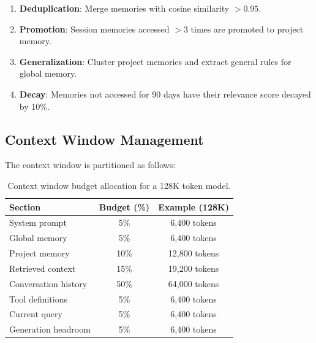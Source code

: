 \begin{enumerate}[leftmargin=1.4em]
    \item \textbf{Deduplication}: Merge memories with cosine similarity $> 0.95$.
    \item \textbf{Promotion}: Session memories accessed $> 3$ times are promoted to project memory.
    \item \textbf{Generalization}: Cluster project memories and extract general rules for global memory.
    \item \textbf{Decay}: Memories not accessed for 90 days have their relevance score decayed by 10\%.
\end{enumerate}

\subsection{Context Window Management}

The context window is partitioned as follows:

\begin{table}[H]
\centering
\begin{tabular}{lcc}
\toprule
\textbf{Section} & \textbf{Budget (\%)} & \textbf{Example (128K)} \\
\midrule
System prompt & 5\% & 6,400 tokens \\
Global memory & 5\% & 6,400 tokens \\
Project memory & 10\% & 12,800 tokens \\
Retrieved context & 15\% & 19,200 tokens \\
Conversation history & 50\% & 64,000 tokens \\
Tool definitions & 5\% & 6,400 tokens \\
Current query & 5\% & 6,400 tokens \\
Generation headroom & 5\% & 6,400 tokens \\
\bottomrule
\end{tabular}
\caption{Context window budget allocation for a 128K token model.}
\label{tab:context_budget}
\end{table}

